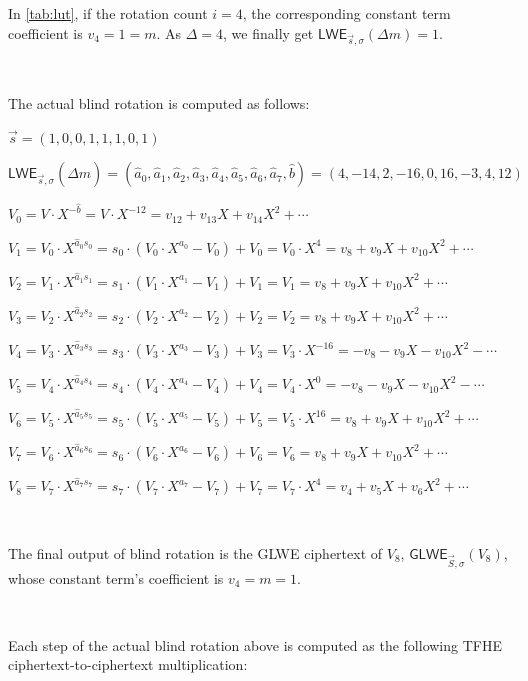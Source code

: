 \begin{enumerate}
In \autoref{tab:lut}, if the rotation count $i = 4$, the corresponding constant term coefficient is $v_4 = 1 = m$. As $\Delta = 4$, we finally get $\textsf{LWE}_{\vec{s},\sigma}(\Delta m) = 1$. 



$ $

The actual blind rotation is computed as follows:

$\vec{s} = (1, 0, 0, 1, 1, 1, 0, 1)$

$\textsf{LWE}_{\vec{s}, \sigma}(\hat{\Delta}m) = (\hat{a}_0, \hat{a}_1, \hat{a}_2, \hat{a}_3, \hat{a}_4, \hat{a}_5, \hat{a}_6, \hat{a}_7, \hat{b}) =  (4, -14, 2, -16, 0, 16, -3, 4, 12)$

$V_0 = V \cdot X^{-\hat{b}} = V \cdot X^{-12} = v_{12} + v_{13}X + v_{14}X^2 + \cdots $

$V_1 = V_0 \cdot X^{\hat{a}_0s_0} = s_0 \cdot (V_0 \cdot X^{a_0} - V_0) + V_0 = V_0 \cdot X^{4} = v_{8} + v_{9}X + v_{10}X^2 + \cdots$ 

$V_2 = V_1 \cdot X^{\hat{a}_1s_1} = s_1 \cdot (V_1 \cdot X^{a_1} - V_1) + V_1 = V_1 = v_{8} + v_{9}X + v_{10}X^2 + \cdots$

$V_3 = V_2 \cdot X^{\hat{a}_2s_2} = s_2 \cdot (V_2 \cdot X^{a_2} - V_2) + V_2 = V_2 = v_{8} + v_{9}X + v_{10}X^2 + \cdots$

$V_4 = V_3 \cdot X^{\hat{a}_3s_3} = s_3 \cdot (V_3 \cdot X^{a_3} - V_3) + V_3 = V_3 \cdot X^{-16} = -v_{8} - v_{9}X - v_{10}X^2 - \cdots$

$V_5 = V_4 \cdot X^{\hat{a}_4s_4} = s_4 \cdot (V_4 \cdot X^{a_4} - V_4) + V_4 = V_4 \cdot X^{0} = -v_{8} - v_{9}X - v_{10}X^2 - \cdots$

$V_6 = V_5 \cdot X^{\hat{a}_5s_5} = s_5 \cdot (V_5 \cdot X^{a_5} - V_5) + V_5 = V_5 \cdot X^{16} = v_{8} + v_{9}X + v_{10}X^2 + \cdots$

$V_7 = V_6 \cdot X^{\hat{a}_6s_6} = s_6 \cdot (V_6 \cdot X^{a_6} - V_6) + V_6 = V_6 = v_{8} + v_{9}X + v_{10}X^2 + \cdots$

$V_8 = V_7 \cdot X^{\hat{a}_7s_7} = s_7 \cdot (V_7 \cdot X^{a_7} - V_7) + V_7 = V_7 \cdot X^{4} = v_{4} + v_5X + v_6X^2 + \cdots $

$ $

The final output of blind rotation is the GLWE ciphertext of $V_8$, $\textsf{GLWE}_{\vec{S}, \sigma}(V_8)$, whose constant term's coefficient is $v_4 = m = 1$. 

$ $

Each step of the actual blind rotation above is computed as the following TFHE ciphertext-to-ciphertext multiplication:


\end{enumerate}
